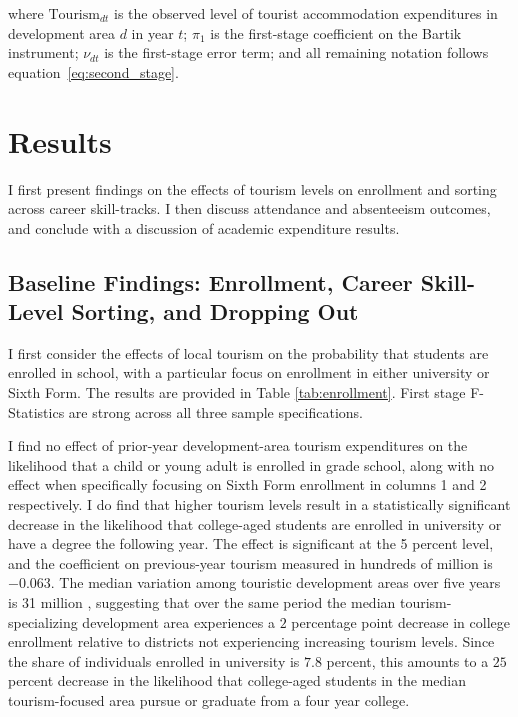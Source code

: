 \documentclass[12pt]{article}
\begin{document}
	\noindent where $\text{Tourism}_{dt}$ is the observed level of tourist accommodation expenditures in development area $d$ in year $t$; $\pi_1$ is the first-stage coefficient on the Bartik instrument; $\nu_{dt}$ is the first-stage error term; and all remaining notation follows equation~\eqref{eq:second_stage}.
		


	\section{Results}
	\label{section:results}
	
	I first present findings on the effects of tourism levels on enrollment and sorting across career skill-tracks. I then discuss attendance and absenteeism outcomes, and conclude with a discussion of academic expenditure results.
	\subsection{Baseline Findings: Enrollment, Career Skill-Level Sorting, and Dropping Out}
	\label{subsec:enrollment}


		I first consider the effects of local tourism on the probability that students are enrolled in school, with a particular focus on enrollment in either university or Sixth Form. The results are provided in Table \ref{tab:enrollment}. First stage F-Statistics are strong across all three sample specifications.
		
		
		I find no effect of prior-year development-area tourism expenditures on the likelihood that a child or young adult is enrolled in grade school, along with no effect when specifically focusing on Sixth Form enrollment in columns 1 and 2 respectively. I do find that higher tourism levels result in a statistically significant decrease in the likelihood that college-aged students are enrolled in university or have a degree the following year. The effect is significant at the 5 percent level, and the coefficient on previous-year tourism measured in hundreds of million is $-0.063$. The median variation among touristic development areas over five years is 31 million \parencite{ mcketty_sun_2026}, suggesting that over the same period the median tourism-specializing development area experiences a $2$ percentage point decrease in college enrollment relative to districts not experiencing increasing tourism levels. Since the share of individuals enrolled in university is $7.8$ percent, this amounts to a $25$ percent decrease in the likelihood that college-aged students in the median tourism-focused area pursue or graduate from a four year college.
		
\end{document}
